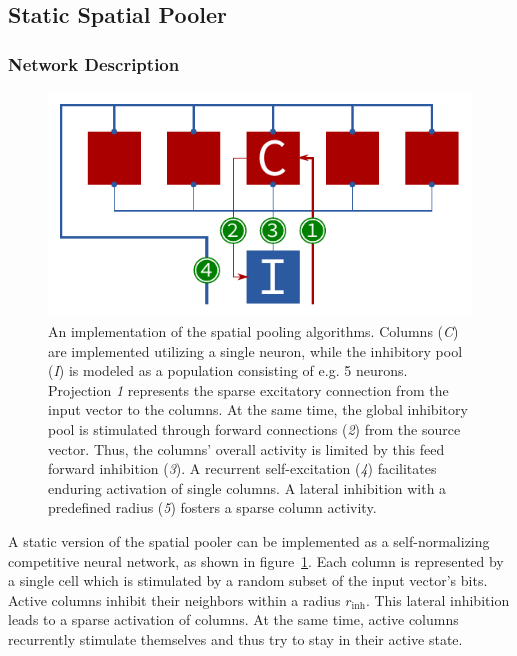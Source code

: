 \subsection{Static Spatial Pooler}

\subsubsection{Network Description}

\begin{figure}
	\begin{center}
		\includegraphics{../circuitry/spatial_pooler.pdf}
	\end{center}
	\caption{An implementation of the spatial pooling algorithms. Columns (\emph{C}) are implemented utilizing a single neuron, while the inhibitory pool (\emph{I}) is modeled as a population consisting of e.g. 5 neurons. Projection \emph{1} represents the sparse excitatory connection from the input vector to the columns. At the same time, the global inhibitory pool is stimulated through forward connections (\emph{2}) from the source vector. Thus, the columns' overall activity is limited by this feed forward inhibition (\emph{3}). A recurrent self-excitation (\emph{4}) facilitates enduring activation of single columns. A lateral inhibition with a predefined radius (\emph{5}) fosters a sparse column activity.}
	\label{fig:static_spatial_pooler}
\end{figure}

A static version of the spatial pooler can be implemented as a self-normalizing competitive neural network, as shown in figure~\ref{fig:static_spatial_pooler}. Each column is represented by a single cell which is stimulated by a random subset of the input vector's bits. Active columns inhibit their neighbors within a radius $r_\text{inh}$. This lateral inhibition leads to a sparse activation of columns. At the same time, active columns recurrently stimulate themselves and thus try to stay in their active state.

